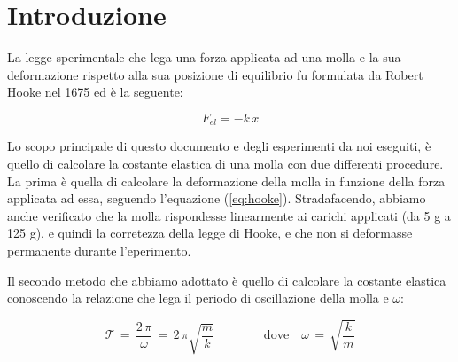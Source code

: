 \section{Introduzione}

La legge sperimentale che lega una forza applicata ad una molla e la sua deformazione rispetto alla sua posizione di equilibrio fu formulata da Robert Hooke nel 1675 ed è la seguente:

\begin{equation}
	F_{el} = -k\,x
	\label{eq:hooke}
\end{equation}

Lo scopo principale di questo documento e degli esperimenti da noi eseguiti,
è quello di calcolare la costante elastica di una molla con due differenti procedure.
La prima è quella di calcolare la deformazione della molla in funzione della forza applicata ad essa, seguendo l'equazione (\ref{eq:hooke}).
Stradafacendo, abbiamo anche verificato che la molla rispondesse linearmente ai carichi applicati (da 5 g a 125 g),
e quindi la corretezza della legge di Hooke, e che non si deformasse permanente durante l'eperimento.

Il secondo metodo che abbiamo adottato è quello di calcolare la costante elastica conoscendo la relazione
che lega il periodo di oscillazione della molla e $\omega$:

\begin{equation}
	\mathcal{T} \,=\, \frac{2\,\pi}{\omega} \,=\, {2\,\pi}{\sqrt{\frac{m}{k}}} \qquad \qquad \text{dove} \quad  \omega \,=\, \sqrt{\frac{k}{m}}
\end{equation}
